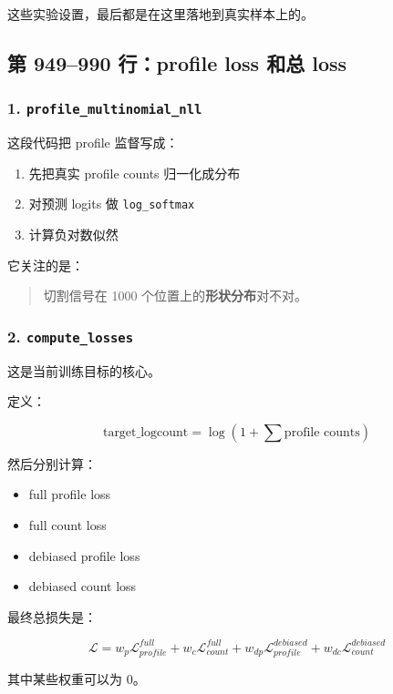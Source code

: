 \documentclass[11pt,a4paper]{ctexart}
\begin{document}
这些实验设置，最后都是在这里落地到真实样本上的。

\subsection{第 949--990 行：profile loss 和总 loss}

\subsubsection*{1. \texttt{profile\_multinomial\_nll}}

这段代码把 profile 监督写成：

\begin{enumerate}[leftmargin=2em]
\item 先把真实 profile counts 归一化成分布
\item 对预测 logits 做 \texttt{log\_softmax}
\item 计算负对数似然
\end{enumerate}

它关注的是：

\begin{quote}
切割信号在 1000 个位置上的\textbf{形状分布}对不对。
\end{quote}

\subsubsection*{2. \texttt{compute\_losses}}

这是当前训练目标的核心。

定义：

\[
\text{target\_logcount}=\log(1+\sum \text{profile counts})
\]

然后分别计算：

\begin{itemize}[leftmargin=2em]
\item full profile loss
\item full count loss
\item debiased profile loss
\item debiased count loss
\end{itemize}

最终总损失是：

\[
\mathcal{L}
=
w_p \mathcal{L}_{profile}^{full}
+
w_c \mathcal{L}_{count}^{full}
+
w_{dp} \mathcal{L}_{profile}^{debiased}
+
w_{dc} \mathcal{L}_{count}^{debiased}
\]

其中某些权重可以为 0。
\end{document}
